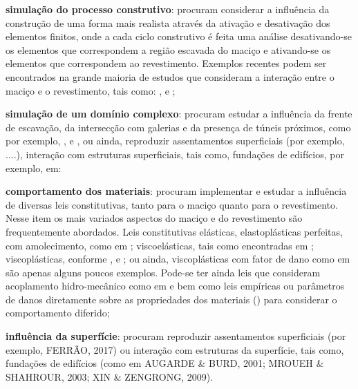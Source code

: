 \begin{alineas}
	
	\item \textbf{simulação do processo construtivo}: procuram considerar a influência da construção de uma forma mais realista através da ativação e desativação dos elementos finitos, onde a cada ciclo construtivo é feita uma análise desativando-se os elementos que correspondem a região escavada do maciço e ativando-se os elementos que correspondem ao revestimento. Exemplos recentes podem ser encontrados na grande maioria de estudos que consideram a interação entre o maciço e o revestimento, tais como: ,  e ;
	
	\item \textbf{simulação de um domínio complexo}: procuram estudar a influência da frente de escavação, da intersecção com galerias e da presença de túneis próximos, como por exemplo, ,   e , ou ainda, reproduzir assentamentos superficiais (por exemplo, ....), interação com estruturas superficiais, tais como, fundações de edifícios, por exemplo, em:
	
	\item \textbf{comportamento dos materiais}: procuram implementar e estudar a influência de diversas leis constitutivas, tanto para o maciço quanto para o revestimento. Nesse item os mais variados aspectos do maciço e do revestimento são frequentemente abordados. Leis constitutivas elásticas, elastoplásticas perfeitas, com amolecimento, como em ; viscoelásticas, tais como encontradas em ; viscoplásticas, conforme ,  e ; ou ainda, viscoplásticas com fator de dano como em  são apenas alguns poucos exemplos. Pode-se ter ainda leis que consideram acoplamento hidro-mecânico como em  e  bem como leis empíricas ou parâmetros de danos diretamente sobre as propriedades dos materiais () para considerar o comportamento diferido;
	
	\item \textbf{influência da superfície}: procuram reproduzir assentamentos superficiais (por exemplo, FERRÃO, 2017) ou interação com estruturas da superfície, tais como, fundações de edifícios (como em AUGARDE \& BURD, 2001; MROUEH \& SHAHROUR, 2003; XIN \& ZENGRONG, 2009).
	

\end{alineas}
